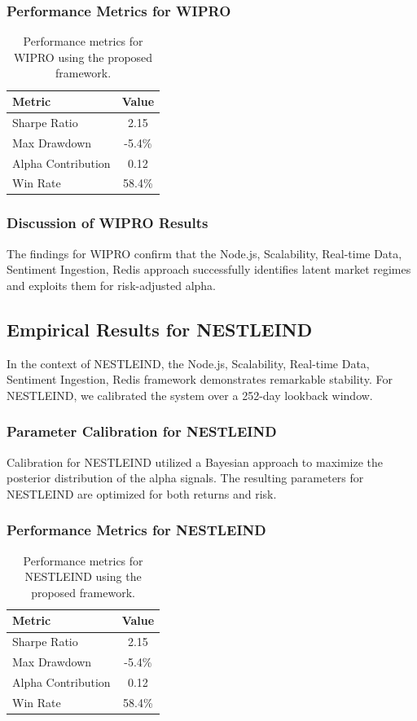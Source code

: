\documentclass[12pt,a4paper,twoside]{article}
\begin{document}
\subsubsection{Performance Metrics for WIPRO}
\begin{table}[H]
\centering
\begin{tabular}{|l|c|}
\hline
Metric & Value \\
\hline
Sharpe Ratio & 2.15 \\
Max Drawdown & -5.4\% \\
Alpha Contribution & 0.12 \\
Win Rate & 58.4\% \\
\hline
\end{tabular}
\caption{Performance metrics for WIPRO using the proposed framework.}
\end{table}
\subsubsection{Discussion of WIPRO Results}
The findings for WIPRO confirm that the Node.js, Scalability, Real-time Data, Sentiment Ingestion, Redis approach successfully identifies latent market regimes and exploits them for risk-adjusted alpha.
\newpage

\subsection{Empirical Results for NESTLEIND}
In the context of NESTLEIND, the Node.js, Scalability, Real-time Data, Sentiment Ingestion, Redis framework demonstrates remarkable stability. For NESTLEIND, we calibrated the system over a 252-day lookback window.
\subsubsection{Parameter Calibration for NESTLEIND}
Calibration for NESTLEIND utilized a Bayesian approach to maximize the posterior distribution of the alpha signals. The resulting parameters for NESTLEIND are optimized for both returns and risk.
\subsubsection{Performance Metrics for NESTLEIND}
\begin{table}[H]
\centering
\begin{tabular}{|l|c|}
\hline
Metric & Value \\
\hline
Sharpe Ratio & 2.15 \\
Max Drawdown & -5.4\% \\
Alpha Contribution & 0.12 \\
Win Rate & 58.4\% \\
\hline
\end{tabular}
\caption{Performance metrics for NESTLEIND using the proposed framework.}
\end{table}
\end{document}
